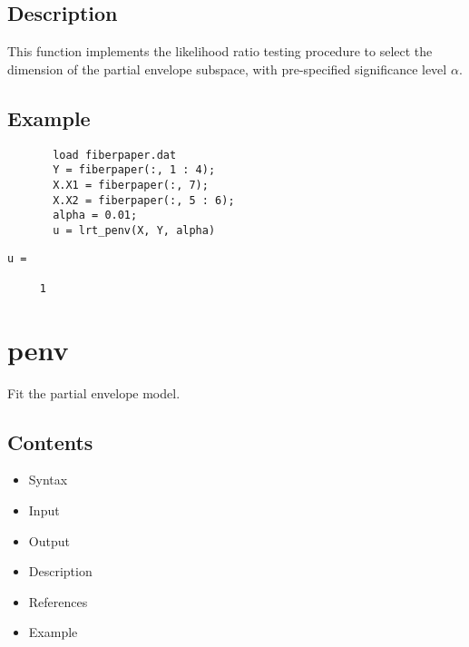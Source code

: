 \documentclass[a4paper,11pt,openany]{memoir}
\begin{document}
\subsection*{Description}

\begin{par}
This function implements the likelihood ratio testing procedure to select the dimension of the partial envelope subspace, with pre-specified significance level $\alpha$.
\end{par} \vspace{1em}


\subsection*{Example}


\begin{verbatim}       load fiberpaper.dat
       Y = fiberpaper(:, 1 : 4);
       X.X1 = fiberpaper(:, 7);
       X.X2 = fiberpaper(:, 5 : 6);
       alpha = 0.01;
       u = lrt_penv(X, Y, alpha)\end{verbatim}
    
        \color{lightgray}\ttfamily \begin{verbatim}
u =

     1

\end{verbatim} \rmfamily
\color{black}


\newpage

\rmfamily
\color{black}\section{penv}

\begin{par}
Fit the partial envelope model.
\end{par} \vspace{1em}

\subsection*{Contents}

\begin{itemize}
\setlength{\itemsep}{-1ex}
   \item Syntax
   \item Input
   \item Output
   \item Description
   \item References
   \item Example
\end{itemize}
\end{document}
